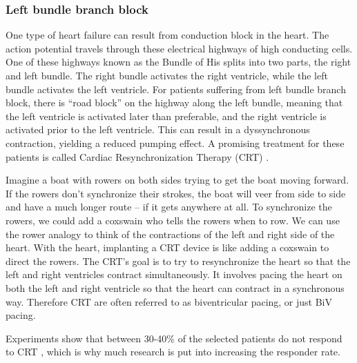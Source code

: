 
\subsubsection{Left bundle branch block}

One type of heart failure can result from conduction block in the
heart. The action potential travels through these electrical highways
of high conducting cells. One of these highways known as the Bundle of
His splits into two parts, the right and left bundle. The right bundle
activates the right ventricle, while the left bundle activates the
left ventricle. For patients suffering from left bundle branch block,
there is ``road block'' on the highway along the left bundle, meaning
that the left ventricle is activated later than preferable, and the
right ventricle is activated prior to the left
ventricle. This can result in a dyssynchronous contraction, yielding a
reduced pumping effect. A promising treatment for these patients is
called Cardiac Resynchronization Therapy (CRT) \cite{cleland2005effect}.

Imagine a boat with rowers on both sides trying to get the boat moving
forward. If the rowers don’t synchronize their strokes, the boat will
veer from side to side and have a much longer route – if it gets
anywhere at all. To synchronize the rowers, we could add a coxswain
who tells the rowers when to row. We can use the rower analogy to
think of the contractions of the left and right side of the
heart. With the heart, implanting a CRT device is like adding a
coxswain to direct the rowers. The CRT’s goal is to try to
resynchronize the heart so that the left and right ventricles contract
simultaneously. It involves pacing the heart on both the left and
right ventricle so that the heart can contract in a synchronous
way. Therefore CRT are often referred to as biventricular pacing, or
just BiV pacing.

Experiments show that between 30-40\% of the selected patients do
not respond to CRT \cite{daubert20122012}, which is why much research
is put into increasing the responder rate. 





